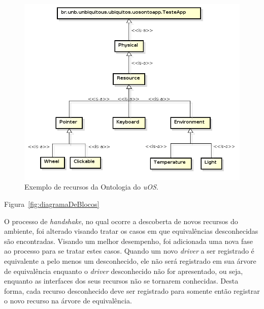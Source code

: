 \begin{figure}[ht]
	\center
	\includegraphics[scale=0.7]{imagens/ontologia}
	\caption{Exemplo de recursos da Ontologia do \emph{uOS}.}
	\label{fig:ontologiaUOS}
\end{figure}

Figura~\ref{fig:diagramaDeBlocos}

O processo de \emph{handshake}, no qual ocorre a descoberta de novos recursos do ambiente, foi alterado visando tratar os casos em que equivalências desconhecidas são encontradas. Visando um melhor desempenho, foi adicionada uma nova fase ao processo para se tratar estes casos. Quando um novo \emph{driver} a ser registrado é equivalente a pelo menos um desconhecido, ele não será registrado em sua árvore de equivalência enquanto o \emph{driver} desconhecido não for apresentado, ou seja, enquanto as interfaces dos seus recursos não se tornarem conhecidas. Desta forma, cada recurso desconhecido deve ser registrado para somente então registrar o novo recurso na árvore de equivalência.
